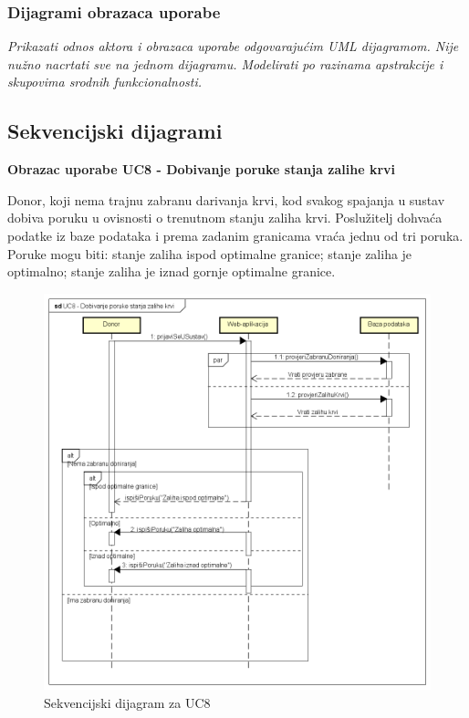 \eject 
\subsubsection{Dijagrami obrazaca uporabe}

\textit{Prikazati odnos aktora i obrazaca uporabe odgovarajućim UML dijagramom. Nije nužno nacrtati sve na jednom dijagramu. Modelirati po razinama apstrakcije i skupovima srodnih funkcionalnosti.}
\eject		

\subsection{Sekvencijski dijagrami}

\textbf{Obrazac uporabe UC8 - Dobivanje poruke stanja zalihe krvi}

Donor, koji nema trajnu zabranu darivanja krvi, kod svakog spajanja u sustav dobiva poruku u ovisnosti o trenutnom stanju zaliha krvi. Poslužitelj dohvaća podatke iz baze podataka i prema zadanim granicama vraća jednu od tri poruka. Poruke mogu biti: stanje zaliha ispod optimalne granice; stanje zaliha je optimalno; stanje zaliha je iznad gornje optimalne granice.

\begin{figure}[H]
	\centering
	\includegraphics[width=\textwidth, scale=0.4]{slike/UC8_Dobivanje poruke stanja zalihe krvi.png}
	\caption{Sekvencijski dijagram za UC8}
	\label{fig:HZTMprimjer}
\end{figure}
\eject

